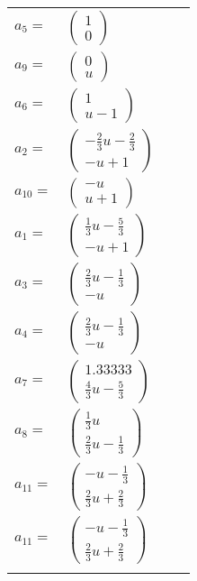\documentclass[1p]{elsarticle_modified}
\theoremstyle{definition}
\begin{document}
\begin{tabular}{m{7pt} m{180pt} m{7pt} m{180pt} }
\flushright $a_{5}=$&$\begin{pmatrix}1\\0\end{pmatrix}$ \\
\flushright $a_{9}=$&$\begin{pmatrix}0\\u\end{pmatrix}$ \\
\flushright $a_{6}=$&$\begin{pmatrix}1\\u-1\end{pmatrix}$ \\
\flushright $a_{2}=$&$\begin{pmatrix}-\frac{2}{3} u-\frac{2}{3}\\- u+1\end{pmatrix}$ \\
\flushright $a_{10}=$&$\begin{pmatrix}- u\\u+1\end{pmatrix}$ \\
\flushright $a_{1}=$&$\begin{pmatrix}\frac{1}{3} u-\frac{5}{3}\\- u+1\end{pmatrix}$ \\
\flushright $a_{3}=$&$\begin{pmatrix}\frac{2}{3} u-\frac{1}{3}\\- u\end{pmatrix}$ \\
\flushright $a_{4}=$&$\begin{pmatrix}\frac{2}{3} u-\frac{1}{3}\\- u\end{pmatrix}$ \\
\flushright $a_{7}=$&$\begin{pmatrix}1.33333\\\frac{4}{3} u-\frac{5}{3}\end{pmatrix}$ \\
\flushright $a_{8}=$&$\begin{pmatrix}\frac{1}{3} u\\\frac{2}{3} u-\frac{1}{3}\end{pmatrix}$ \\
\flushright $a_{11}=$&$\begin{pmatrix}- u-\frac{1}{3}\\\frac{2}{3} u+\frac{2}{3}\end{pmatrix}$\\ \flushright $a_{11}=$&$\begin{pmatrix}- u-\frac{1}{3}\\\frac{2}{3} u+\frac{2}{3}\end{pmatrix}$\\&\end{tabular}
\end{document}
